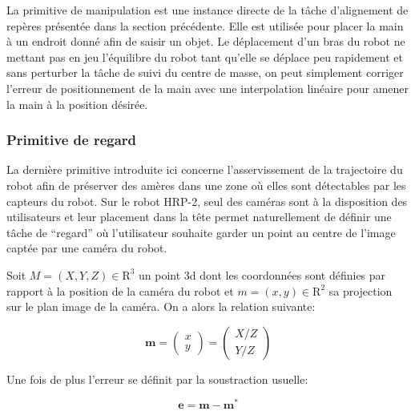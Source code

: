 La primitive de manipulation est une instance directe de la tâche
d'alignement de repères présentée dans la section précédente. Elle
est utilisée pour placer la main à un endroit donné afin de saisir un
objet. Le déplacement d'un bras du robot ne mettant pas en jeu
l'équilibre du robot tant qu'elle se déplace peu rapidement et sans
perturber la tâche de suivi du centre de masse, on peut simplement
corriger l'erreur de positionnement de la main avec une interpolation
linéaire pour amener la main à la position désirée.


\subsubsection{Primitive de regard}


La dernière primitive introduite ici concerne l'asservissement de la
trajectoire du robot afin de préserver des amères dans une zone où
elles sont détectables par les capteurs du robot. Sur le robot HRP-2,
seul des caméras sont à la disposition des utilisateurs et leur
placement dans la tête permet naturellement de définir une tâche de
``regard'' où l'utilisateur souhaite garder un point au centre de
l'image captée par une caméra du robot.

Soit \mbox{$M = (X, Y, Z) \in \mathrm{R}^3$} un point 3d dont les
coordonnées sont définies par rapport à la position de la caméra du
robot et \mbox{$m = (x, y) \in \mathrm{R}^2$} sa projection sur le
plan image de la caméra. On a alors la relation suivante:

\begin{equation}
  \mathbf{m} = \left(
  \begin{array}{c}
    x\\
    y
  \end{array}
  \right) = \left(
  \begin{array}{c}
    X / Z\\
    Y / Z
  \end{array}
  \right)
\end{equation}


Une fois de plus l'erreur se définit par la soustraction usuelle:

\begin{equation}
  \mathbf{e} = \mathbf{m} - \mathbf{m}^*
\end{equation}

